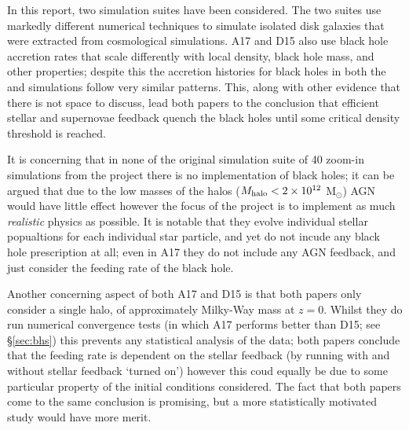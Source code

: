 In this report, two simulation suites have been considered. The two suites use
markedly different numerical techniques to simulate isolated disk galaxies
that were extracted from cosmological simulations. A17 and D15 also use
black hole accretion rates that scale differently with local density, black
hole mass, and other properties; despite this the accretion histories for
black holes in both the \fire{} and \hagn{} simulations follow very similar
patterns. This, along with other evidence that there is not space to discuss,
lead both papers to the conclusion that efficient stellar and supernovae
feedback quench the black holes until some critical density threshold is
reached.

It is concerning that in none of the original simulation suite of 40 zoom-in
simulations from the \fire{} project there is no implementation of black holes;
it can be argued that due to the low masses of the halos ($M_{\rm halo} < 2
\times 10^{12}$ M$_\odot$) AGN would have little effect \citep[see e.g.][and
citations]{bower_breaking_2006} however the focus of the \fire{} project is to
implement as much \emph{realistic} physics as possible. It is notable that they
evolve individual stellar popualtions for each individual star particle, and
yet do not incude any black hole prescription at all; even in A17 they do not
include any AGN feedback, and just consider the feeding rate of the black hole.

Another concerning aspect of both A17 and D15 is that both papers only consider
a single halo, of approximately Milky-Way mass at $z=0$. Whilst they do run
numerical convergence tests (in which A17 performs better than D15; see
§\ref{sec:bhs}) this prevents any statistical analysis of the data; both papers
conclude that the feeding rate is dependent on the stellar feedback (by running
with and without stellar feedback `turned on') however this coud equally be due
to some particular property of the initial conditions considered. The fact that
both papers come to the same conclusion is promising, but a more statistically
motivated study would have more merit.
